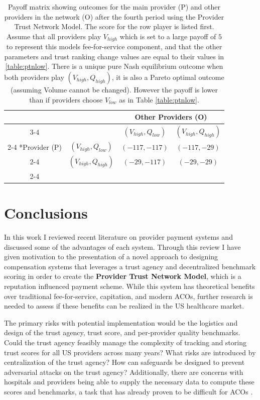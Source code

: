 \documentclass{article}
\begin{document}
\begin{table}[H]
\centering
  \setlength{\extrarowheight}{2pt}
  \begin{tabular}{*{4}{c|}}
    \multicolumn{2}{c}{} & \multicolumn{2}{c}{Other Providers (O)}\\\cline{3-4}
    \multicolumn{1}{c}{} &  & $(V_{high}, Q_{low})$  & $(V_{high}, Q_{high})$ \\\cline{2-4}
    \multirow{2}*{Provider (P)}  & $(V_{high}, Q_{low})$ & $(-117, -117)$ & $(-117, -29)$ \\\cline{2-4}
    & $(V_{high}, Q_{high})$ & $(-29, -117)$ & $(-29, -29)$ \\\cline{2-4}
  \end{tabular}
    \caption{Payoff matrix showing outcomes for the main provider (P) and other providers in the network (O) after the fourth period using the Provider Trust Network Model. The score for the row player is listed first. Assume that all providers play $V_{high}$ which is set to a large payoff of $5$ to represent this models fee-for-service component, and that the other parameters and trust ranking change values are equal to their values in \ref{table:ptnlow}. There is a unique pure Nash equilibrium outcome when both providers play $(V_{high}, Q_{high})$, it is also a Pareto optimal outcome (assuming Volume cannot be changed). However the payoff is lower than if providers choose $V_{low}$ as in Table \ref{table:ptnlow}.}
\label{table:ptnhigh}
\end{table}

\section{Conclusions}
In this work I reviewed recent literature on provider payment systems and discussed some of the advantages of each system. Through this review I have given motivation to the presentation of a novel approach to designing compensation systems that leverages a trust agency and decentralized benchmark scoring in order to create the \textbf{Provider Trust Network Model}, which is a reputation influenced payment scheme. While this system has theoretical benefits over traditional fee-for-service, capitation, and modern ACOs, further research is needed to assess if these benefits can be realized in the US healthcare market.

The primary risks with potential implementation would be the logistics and design of the trust agency, trust score, and per-provider quality benchmarks. Could the trust agency feasibly manage the complexity of tracking and storing trust scores for all US providers across many years? What risks are introduced by centralization of the trust agency? How can safeguards be designed to prevent adversarial attacks on the trust agency? Additionally, there are concerns with hospitals and providers being able to supply the necessary data to compute these scores and benchmarks, a task that has already proven to be difficult for ACOs \cite{acoecon}.
\end{document}
